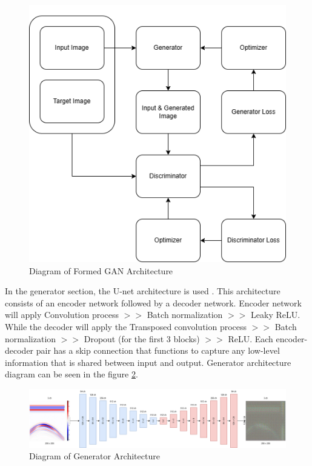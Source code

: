 \documentclass[conference]{IEEEtran}
\begin{document}
\begin{figure}[ht]
  \centering
  \includegraphics[scale=0.45]{gambar/Arsitektur GAN.png}
  \caption{Diagram of Formed GAN Architecture}
  \label{fig:arsitekturGAN}
\end{figure}

In the generator section, the U-net architecture is used \cite{c1}. 
This architecture consists of an encoder network followed by a decoder network. 
Encoder network will apply Convolution process $>>$ Batch normalization $>>$ Leaky ReLU. 
While the decoder will apply the Transposed convolution process $>>$ Batch normalization $>>$ Dropout (for the first 3 blocks) $>>$ ReLU. 
Each encoder-decoder pair has a skip connection that functions to capture any low-level information that is shared between input and output. 
Generator architecture diagram can be seen in the figure \ref{fig:generator}.

\begin{figure}[ht]
  \centering
  \includegraphics[scale=0.15]{gambar/Generator.png}
  \caption{Diagram of Generator Architecture}
  \label{fig:generator}
\end{figure}
\end{document}
